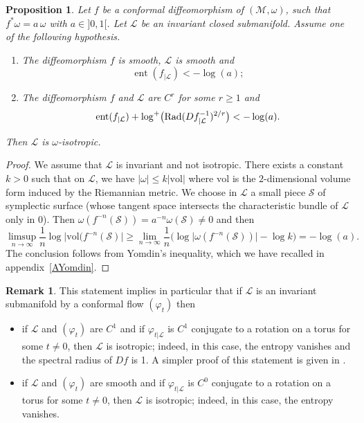 \documentclass[10pt]{amsart}
\newtheorem{proposition}{Proposition}
\theoremstyle{definition}
\newtheorem{remark}[theorem]{Remark}
\def\cL{{\mathcal L}}
\def\cM{{\mathcal M}}
\def\cS{{\mathcal S}}
\DeclareMathOperator{\ent}{ent}
\begin{document}
\begin{proposition}\label{PYomdin}
Let $f$ be a conformal diffeomorphism of $(\cM, \omega)$, \ie such that $f^*\omega=a\,\omega$ with $a\in{}]0, 1[$. Let ${\cL}$ be an invariant closed submanifold. Assume one of the following hypothesis.
\begin{enumerate}
\item The diffeomorphism $f$ is smooth, $\cL$ is smooth and\vspace*{-3pt}
\[
\ent(f_{|{\cL}}) < - \log(a);
\]
\item The diffeomorphism $f$ and $\cL$ are $C^r$ for some $r\geq 1$ and\vspace*{-3pt}
\[
\ent(f_{|{\cL}}) + \log^+\bigl(\text{\rm Rad} (Df^{-1}_{|{\cL}})^{2/r}\bigr) < -\log(a).
\]
\end{enumerate}
Then ${\cL}$ is $\omega$-isotropic.
\end{proposition}

\begin{proof}
We assume that $\cL$ is invariant and not isotropic. There exists a constant $k>0$ such that on $\cL$, we have $\vert\omega\vert\leq k\vert \mathrm{vol}\vert$ where $\mathrm{vol}$ is the $2$\nobreakdash-dimensional volume form induced by the Riemannian metric. We choose in $\cL$ a small piece $\cS$ of symplectic surface (whose tangent space intersects the characteristic bundle of $\cL$ only in $0$). Then $\omega(f^{-n}(\cS))=a^{-n}\omega(\cS)\not=0$ and then
\[
\limsup_{n\to \infty} \frac{1}{n}\log\Big\vert \mathrm{vol}(f^{-n}
(\cS)\Big\vert\geq \lim_{n\to\infty}\frac{1}{n}\big(\log\vert \omega(f^{-n}(\cS))\vert-\log k\big)=-\log(a).
\]
The conclusion follows from Yomdin's inequality, which we have recalled in appendix~\ref{AYomdin}.
\end{proof}

\begin{remark}
This statement implies in particular that if $\cL$ is an invariant submanifold by a conformal flow $(\varphi_t)$ then
\begin{itemize}
\item if $\cL$ and $(\varphi_t)$ are $C^1$ and if $\varphi_{t|\cL}$ is $C^1$ conjugate to a rotation on a torus for some $t\not=0$, then $\cL$ is isotropic; indeed, in this case, the entropy vanishes and the spectral radius of $Df$ is 1. A simpler proof of this statement is given in \cite{CaCeLlA2013}.
\item if $\cL$ and $(\varphi_t)$ are smooth and if $\varphi_{t|\cL}$ is $C^0$ conjugate to a rotation on a torus for some $t\not=0$, then $\cL$ is isotropic; indeed, in this case, the entropy vanishes.
\end{itemize}
\end{remark}
\end{document}
